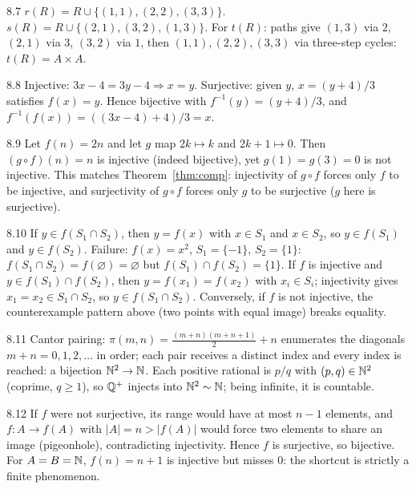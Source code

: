 \begin{solution}{8.7}
$r(R) = R \cup \{(1,1),(2,2),(3,3)\}$.
$s(R) = R \cup \{(2,1),(3,2),(1,3)\}$.
For $t(R)$: paths give $(1,3)$ via $2$, $(2,1)$ via $3$, $(3,2)$ via $1$,
then $(1,1),(2,2),(3,3)$ via three-step cycles: $t(R) = A \times A$.
\end{solution}

\begin{solution}{8.8}
Injective: $3x - 4 = 3y - 4 \Rightarrow x = y$. Surjective: given $y$,
$x = (y+4)/3$ satisfies $f(x) = y$. Hence bijective with
$f^{-1}(y) = (y+4)/3$, and
$f^{-1}(f(x)) = ((3x-4)+4)/3 = x$.
\end{solution}

\begin{solution}{8.9}
Let $f(n) = 2n$ and let $g$ map $2k \mapsto k$ and $2k+1 \mapsto 0$. Then
$(g \circ f)(n) = n$ is injective (indeed bijective), yet $g(1) = g(3) = 0$
is not injective. This matches Theorem~\ref{thm:comp}: injectivity of
$g \circ f$ forces only \emph{$f$} to be injective, and surjectivity of
$g \circ f$ forces only \emph{$g$} to be surjective ($g$ here is
surjective).
\end{solution}

\begin{solution}{8.10}
If $y \in f(S_1 \cap S_2)$, then $y = f(x)$ with $x \in S_1$ and
$x \in S_2$, so $y \in f(S_1)$ and $y \in f(S_2)$. Failure:
$f(x) = x^2$, $S_1 = \{-1\}$, $S_2 = \{1\}$: $f(S_1 \cap S_2) =
f(\varnothing) = \varnothing$ but $f(S_1) \cap f(S_2) = \{1\}$. If $f$ is
injective and $y \in f(S_1) \cap f(S_2)$, then $y = f(x_1) = f(x_2)$ with
$x_i \in S_i$; injectivity gives $x_1 = x_2 \in S_1 \cap S_2$, so
$y \in f(S_1 \cap S_2)$. Conversely, if $f$ is not injective, the
counterexample pattern above (two points with equal image) breaks equality.
\end{solution}

\begin{solution}{8.11}
Cantor pairing: $\pi(m,n) = \frac{(m+n)(m+n+1)}{2} + n$ enumerates the
diagonals $m + n = 0, 1, 2, \ldots$ in order; each pair receives a distinct
index and every index is reached: a bijection $\mathbb{N}^2 \to \mathbb{N}$. Each positive
rational is $p/q$ with $(p,q) \in \mathbb{N}^2$ (coprime, $q \ge 1$), so $\mathbb{Q}^{+}$
injects into $\mathbb{N}^2 \sim \mathbb{N}$; being infinite, it is countable.
\end{solution}

\begin{solution}{8.12}
If $f$ were not surjective, its range would have at most $n - 1$ elements,
and $f : A \to f(A)$ with $|A| = n > |f(A)|$ would force two elements to
share an image (pigeonhole), contradicting injectivity. Hence $f$ is
surjective, so bijective. For $A = B = \mathbb{N}$, $f(n) = n + 1$ is injective but
misses $0$: the shortcut is strictly a finite phenomenon.
\end{solution}
